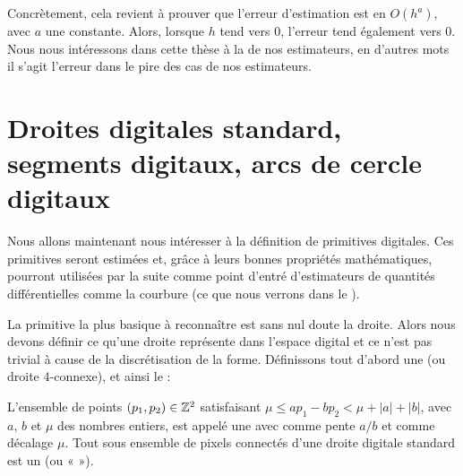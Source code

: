 Concrètement, cela revient à prouver que l'erreur d'estimation est en $O(h^a)$,
avec $a$ une constante. Alors, lorsque $h$ tend vers $0$, l'erreur tend
également vers $0$. Nous nous intéressons dans cette thèse à la
 de nos estimateurs, en d'autres
mots il s'agit l'erreur dans le pire des cas de nos estimateurs.
%
\section{Droites digitales standard, segments digitaux, arcs de cercle digitaux}%
\label{sec:segments}
%
Nous allons maintenant nous intéresser à la définition de primitives digitales.
Ces primitives seront estimées et, grâce à leurs bonnes propriétés
mathématiques, pourront utilisées par la suite comme point d'entré d'estimateurs
de quantités différentielles comme la courbure (ce que nous verrons dans le
).


La primitive la plus basique à reconnaître est sans nul doute la droite. Alors
nous devons définir ce qu'une droite représente dans l'espace digital et ce
n'est pas trivial à cause de la discrétisation de la forme. Définissons tout
d'abord une  (ou droite $4$-connexe), et
ainsi le  :
%
\begin{definition}{}
  \label{def:DSS}
%
  L'ensemble de points $(p_1,p_2) \in \mathbb{Z}^2$ satisfaisant $\mu \le ap_1 - bp_2 <
  \mu + |a| + |b|$, avec $a$, $b$ et $\mu$ des nombres entiers, est appelé une
   avec comme pente $a/b$ et comme décalage
  $\mu$. Tout sous ensemble de pixels connectés d'une droite digitale standard
  est un  (ou «  »).
%
\end{definition}


